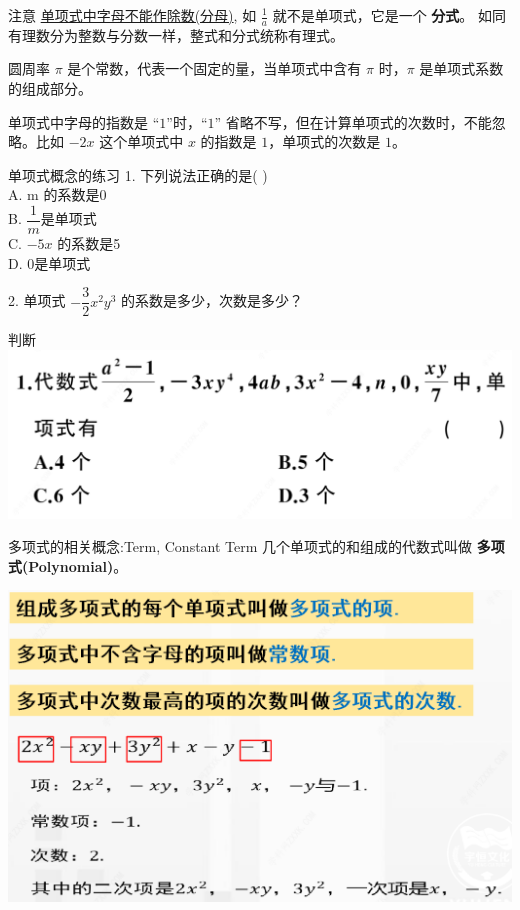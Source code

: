 \documentclass{beamer}
\begin{document}
	\begin{frame}{注意}
		\underline{单项式中字母不能作除数(分母)}, 如 $ \frac{1}{a}$ 就不是单项式，它是一个 				\textbf{分式}。 如同有理数分为整数与分数一样，整式和分式统称有理式。
		
		\vspace{2ex}
		圆周率 $\pi$ 是个常数，代表一个固定的量，当单项式中含有 $\pi$ 时，$\pi$ 是单项式系数			的组成部分。
		
		\vspace{2ex}
		单项式中字母的指数是 “$1$”时，“$1$” 省略不写，但在计算单项式的次数时，不能忽				略。比如 $-2x$ 这个单项式中 $x$ 的指数是 $1$，单项式的次数是 $1$。
	\end{frame}
	
	\begin{frame}{单项式概念的练习}
		1. 下列说法正确的是(  )\\
		\hspace{2ex}A. m 的系数是0 \\
		\hspace{2ex}B. $ \dfrac{1}{m}$是单项式 \\
		\hspace{2ex}C. $ -5x $ 的系数是5 \\
		\hspace{2ex}D. 0是单项式
		
		\vspace{3ex}
		2. 单项式 $-\dfrac{3}{2}x^2y^3$ 的系数是多少，次数是多少？
	\end{frame}
	
	\begin{frame}{判断}
		\includegraphics[width = .8\textwidth]{assets/monomial 2.png}
	\end{frame}
	
	\begin{frame}{多项式的相关概念:Term, Constant Term}
		几个单项式的和组成的代数式叫做 \textbf{多项式(Polynomial)}。
		
		\vspace{3ex}
		\includegraphics[width = .8\textwidth]{assets/polynomial.png}
	\end{frame}
	
\end{document}
